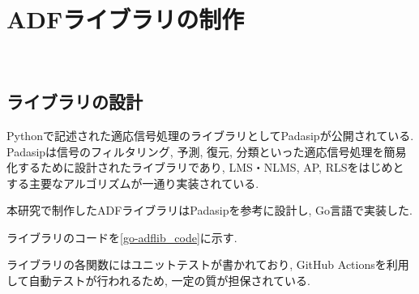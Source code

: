 







\section{ADFライブラリの制作}\label{create-adflib}

\
\subsection{ライブラリの設計}\label{design-adf}

Pythonで記述された適応信号処理のライブラリとしてPadasip\cite{padasip}が公開されている. Padasipは信号のフィルタリング, 予測, 復元, 分類といった適応信号処理を簡易化するために設計されたライブラリであり, LMS・NLMS, AP, RLSをはじめとする主要なアルゴリズムが一通り実装されている. 

本研究で制作したADFライブラリはPadasipを参考に設計し, Go言語で実装した. 

ライブラリのコードを\ref{go-adflib_code}に示す. 

ライブラリの各関数にはユニットテストが書かれており, GitHub
Actionsを利用して自動テストが行われるため, 一定の質が担保されている. 

